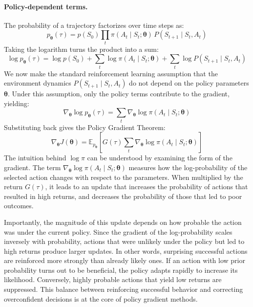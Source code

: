 \paragraph{Policy-dependent terms.}
The probability of a trajectory factorizes over time steps as:
\begin{equation}
    p_{\boldsymbol{\theta}}(\tau)
    = p(S_0) \prod_{t} \pi(A_t \mid S_t; \boldsymbol{\theta})
    \, P(S_{t+1} \mid S_t, A_t)
\end{equation}
Taking the logarithm turns the product into a sum:
\begin{equation}
    \log p_{\boldsymbol{\theta}}(\tau)
    = \log p(S_0)
    + \sum_t \log \pi(A_t \mid S_t; \boldsymbol{\theta})
    + \sum_t \log P(S_{t+1} \mid S_t, A_t)
\end{equation}
We now make the standard reinforcement learning assumption that the
environment dynamics $P(S_{t+1} \mid S_t, A_t)$ do not depend on the policy
parameters $\boldsymbol{\theta}$. Under this assumption, only the policy
terms contribute to the gradient, yielding:
\begin{equation}
    \nabla_{\boldsymbol{\theta}} \log p_{\boldsymbol{\theta}}(\tau)
    = \sum_t \nabla_{\boldsymbol{\theta}} \log \pi(A_t \mid S_t;
    \boldsymbol{\theta})
\end{equation}
Substituting back gives the Policy Gradient Theorem:
\begin{equation}
\nabla_{\boldsymbol{\theta}} J(\boldsymbol{\theta})
= \mathbb{E}_{p_{\boldsymbol{\theta}}} \left[ G(\tau) \sum_t
\nabla_{\boldsymbol{\theta}} \log \pi(A_t \mid S_t; \boldsymbol{\theta}) \right]
\end{equation}
The intuition behind $\log \pi$ can be understood by examining the form of the gradient. The term $\nabla_{\boldsymbol{\theta}} \log \pi(A_t \mid S_t; \boldsymbol{\theta})$ measures how the log-probability of the selected action changes with respect to the parameters. When multiplied by the return $G(\tau)$, it leads to an update that increases the probability of actions that resulted in high returns, and decreases the probability of those that led to 
poor outcomes.

Importantly, the magnitude of this update depends on how probable the action was under the current policy. Since the gradient of the log-probability scales inversely with probability, actions that were unlikely under the policy but led to high returns produce larger updates. In other words, surprising successful actions are reinforced more strongly than already likely ones. If an action with low prior probability turns out to be beneficial, the policy adapts rapidly to increase its likelihood. Conversely, highly probable actions that yield low returns are suppressed. This balance between reinforcing successful behavior and correcting overconfident decisions is at the core of policy gradient methods.

